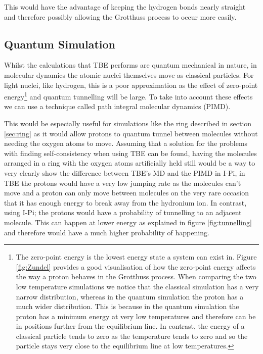 \documentclass{article}
\begin{document}
\begin{multicols}{2}
This would have the advantage of keeping the hydrogen bonds nearly straight and therefore possibly allowing the Grotthuss process to occur more easily.

\subsection{Quantum Simulation}
\label{sec:PIMD}
Whilst the calculations that TBE performs are quantum mechanical in nature, in molecular dynamics the atomic nuclei themselves move as classical particles. For light nuclei, like hydrogen, this is a poor approximation as the effect of zero-point energy\footnote{The zero-point energy is the lowest energy state a system can exist in. Figure \ref{fig:Zundel} provides a good visualisation of how the zero-point energy affects the way a proton behaves in the Grotthuss process. When comparing the two low temperature simulations we notice that the classical simulation has a very narrow distribution, whereas in the quantum simulation the proton has a much wider distribution. This is because in the quantum simulation the proton has a minimum energy at very low temperatures and therefore can be in positions further from the equilibrium line. In contrast, the energy of a classical particle tends to zero as the temperature tends to zero and so the particle stays very close to the equilibrium line at low temperatures.} and quantum tunnelling will be large. To take into account these effects we can use a technique called path integral molecular dynamics (PIMD).\cite{Feynman1965,Feynman1948,Gillan1990}

This would be especially useful for simulations like the ring described in section \ref{sec:ring} as it would allow protons to quantum tunnel between molecules without needing the oxygen atoms to move. Assuming that a solution for the problems with finding self-consistency when using TBE can be found, having the molecules arranged in a ring with the oxygen atoms artificially held still would be a way to very clearly show the difference between TBE's MD and the PIMD in I-Pi, in TBE the protons would have a very low jumping rate as the molecules can't move and a proton can only move between molecules on the very rare occasion that it has enough energy to break away from the hydronium ion. In contrast, using I-Pi; the protons would have a probability of tunnelling to an adjacent molecule. This can happen at lower energy as explained in figure \ref{fig:tunnelling} and therefore would have a much higher probability of happening.


\end{multicols}
\end{document}
